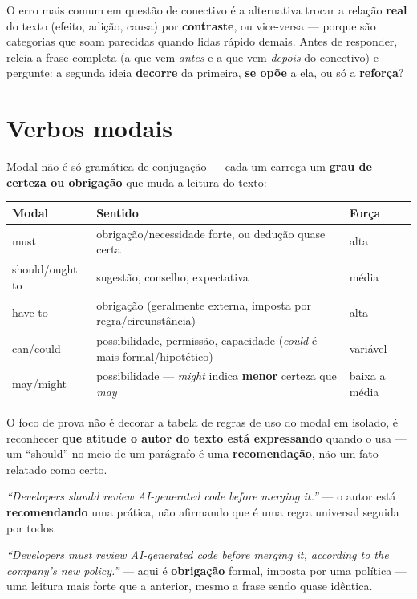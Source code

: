 \begin{cuidado}
O erro mais comum em questão de conectivo é a alternativa trocar a relação
\textbf{real} do texto (efeito, adição, causa) por \textbf{contraste}, ou
vice-versa --- porque são categorias que soam parecidas quando lidas
rápido demais. Antes de responder, releia a frase completa (a que vem
\emph{antes} e a que vem \emph{depois} do conectivo) e pergunte: a segunda
ideia \textbf{decorre} da primeira, \textbf{se opõe} a ela, ou só a
\textbf{reforça}?
\end{cuidado}

\section{Verbos modais}

\begin{conceito}
Modal não é só gramática de conjugação --- cada um carrega um
\textbf{grau de certeza ou obrigação} que muda a leitura do texto:

\begin{center}
\begin{tabular}{@{}p{2.4cm}p{4.6cm}p{4.4cm}@{}}
\toprule
\textbf{Modal} & \textbf{Sentido} & \textbf{Força} \\
\midrule
must & obrigação/necessidade forte, ou dedução quase certa & alta \\
should/ought to & sugestão, conselho, expectativa & média \\
have to & obrigação (geralmente externa, imposta por regra/circunstância) &
alta \\
can/could & possibilidade, permissão, capacidade (\textit{could} é mais
formal/hipotético) & variável \\
may/might & possibilidade --- \textit{might} indica \textbf{menor}
certeza que \textit{may} & baixa a média \\
\bottomrule
\end{tabular}
\end{center}

O foco de prova não é decorar a tabela de regras de uso do modal em
isolado, é reconhecer \textbf{que atitude o autor do texto está expressando}
quando o usa --- um “should” no meio de um parágrafo é uma
\textbf{recomendação}, não um fato relatado como certo.
\end{conceito}

\begin{exemplo}
\textit{“Developers should review AI-generated code before merging it.”}
--- o autor está \textbf{recomendando} uma prática, não afirmando que é
uma regra universal seguida por todos.

\textit{“Developers must review AI-generated code before merging it,
according to the company's new policy.”} --- aqui é \textbf{obrigação}
formal, imposta por uma política --- uma leitura mais forte que a
anterior, mesmo a frase sendo quase idêntica.
\end{exemplo}

